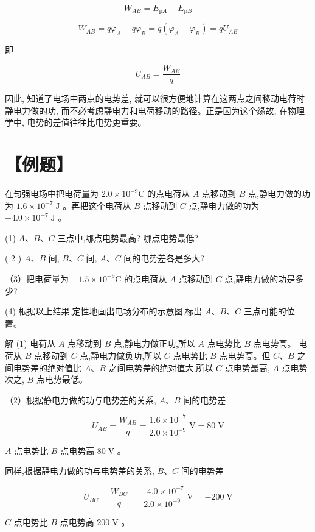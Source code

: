 \documentclass[10pt]{article}
\begin{document}
\[
{W}_{AB} = {E}_{\mathrm{p}A} - {E}_{\mathrm{p}B}
\]

\[
{W}_{AB} = q{\varphi }_{A} - q{\varphi }_{B} = q\left( {{\varphi }_{A} - {\varphi }_{B}}\right) = q{U}_{AB}
\]

即

\[
{U}_{AB} = \frac{{W}_{AB}}{q}
\]

因此, 知道了电场中两点的电势差, 就可以很方便地计算在这两点之间移动电荷时静电力做的功, 而不必考虑静电力和电荷移动的路径。正是因为这个缘故, 在物理学中, 电势的差值往往比电势更重要。

\section*{【例题】}

在匀强电场中把电荷量为 \({2.0} \times {10}^{-9}\mathrm{C}\) 的点电荷从 \(A\) 点移动到 \(B\) 点,静电力做的功为 \({1.6} \times {10}^{-7}\mathrm{\;J}\) 。再把这个电荷从 \(B\) 点移动到 \(C\) 点,静电力做的功为 \(- {4.0} \times {10}^{-7}\mathrm{\;J}\) 。

(1) \(A\text{、}B\text{、}C\) 三点中,哪点电势最高? 哪点电势最低?

( 2 ) \(A\text{、}B\) 间, \(B\text{、}C\) 间, \(A\text{、}C\) 间的电势差各是多大?

（3）把电荷量为 \(- {1.5} \times {10}^{-9}\mathrm{C}\) 的点电荷从 \(A\) 点移动到 \(C\) 点,静电力做的功是多少?

(4) 根据以上结果,定性地画出电场分布的示意图,标出 \(A\text{、}B\text{、}C\) 三点可能的位置。

解 (1) 电荷从 \(A\) 点移动到 \(B\) 点,静电力做正功,所以 \(A\) 点电势比 \(B\) 点电势高。 电荷从 \(B\) 点移动到 \(C\) 点,静电力做负功,所以 \(C\) 点电势比 \(B\) 点电势高。但 \(C\text{、}B\) 之间电势差的绝对值比 \(A\text{、}B\) 之间电势差的绝对值大,所以 \(C\) 点电势最高, \(A\) 点电势次之, \(B\) 点电势最低。

（2）根据静电力做的功与电势差的关系, \(A\text{、}B\) 间的电势差

\[
{U}_{AB} = \frac{{W}_{AB}}{q} = \frac{{1.6} \times {10}^{-7}}{{2.0} \times {10}^{-9}}\mathrm{\;V} = {80}\mathrm{\;V}
\]

\(A\) 点电势比 \(B\) 点电势高 \({80}\mathrm{\;V}\) 。

同样,根据静电力做的功与电势差的关系, \(B\text{、}C\) 间的电势差

\[
{U}_{BC} = \frac{{W}_{BC}}{q} = \frac{-{4.0} \times {10}^{-7}}{{2.0} \times {10}^{-9}}\mathrm{\;V} = - {200}\mathrm{\;V}
\]

\(C\) 点电势比 \(B\) 点电势高 \({200}\mathrm{\;V}\) 。
\end{document}
